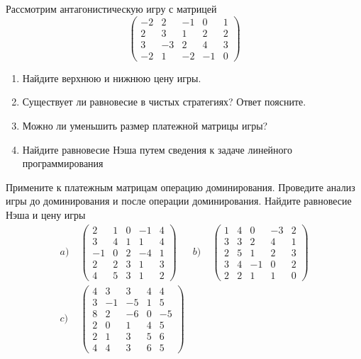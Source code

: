 \begin{exercise}
Рассмотрим антагонистическую игру с матрицей
\[
	\begin{pmatrix}
	-2 & 2 & -1 & 0 & 1 \\
	2 & 3 & 1 & 2 & 2 \\
	3 & -3 & 2 & 4 & 3 \\
	-2 & 1 & -2 & -1 & 0
	\end{pmatrix}
\]
\begin{enumerate}
	\item Найдите верхнюю и нижнюю цену игры.
	\item Существует ли равновесие в чистых стратегиях? Ответ поясните.
	\item Можно ли уменьшить размер платежной матрицы игры?
	\item Найдите равновесие Нэша путем сведения к задаче линейного
	программирования %
\end{enumerate}
\end{exercise}

\begin{exercise}
Примените к платежным матрицам операцию доминирования. Проведите анализ игры до доминирования и 
после операции доминирования. Найдите равновесие Нэша и цену игры
\begin{align*}
	a)&\;\begin{pmatrix} 2 & 1& 0 & -1 & 4 \\ 3 & 4 & 1 & 1 & 4 \\
	-1 & 0 & 2 & -4 & 1 \\ 2 & 2 & 3 & 1 & 3 \\ 4 & 5 & 3 & 1 & 2 \end{pmatrix} &
	b)&\; \begin{pmatrix} 1 & 4 & 0 & -3 & 2 \\ 3 & 3 & 2 & 4  & 1 \\ 2 & 5 & 1 & 2 & 3 \\ 
	3 & 4 & -1 & 0 & 2 \\ 2 & 2 & 1 & 1 & 0 \end{pmatrix} \\
	c)&\; \begin{pmatrix} 4 & 3 & 3 & 4 & 4 \\ 3 & -1 & -5 & 1 & 5 \\ 8 & 2 & -6 & 0 & -5 \\ 
	2 & 0 & 1 & 4 & 5 \\ 2 & 1 & 3 & 5 & 6 \\ 4 & 4 & 3 & 6 & 5 \end{pmatrix}
\end{align*}
\end{exercise}

